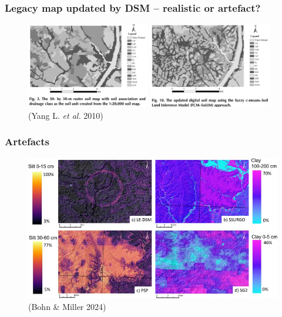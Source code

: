 \documentclass[aspectratio=169, 10pt]{beamer}
\begin{document}
\begin{frame}
  \frametitle{Legacy map updated by DSM -- realistic or artefact?}
    \begin{figure}
        {\centering
        \includegraphics[width=0.48\textwidth]{./graphics_david/sssaj2010.0002_YL_original.png}
        \hfill
        \includegraphics[width=0.48\textwidth]{./graphics_david/sssaj2010.0002_YL_updated.png}
        }\\\flushleft(Yang L. \emph{et al.} 2010)  
    \end{figure}
\end{frame}

\begin{frame}
  \frametitle{Artefacts}
    \begin{figure}
        {\centering
        \includegraphics[height=0.6\textheight]{./graphics_david/1-s2.0-S0016706124000107-gr15.jpg}
        }\\\flushleft(Bohn \& Miller 2024)
    \end{figure}
\end{frame}
\end{document}
